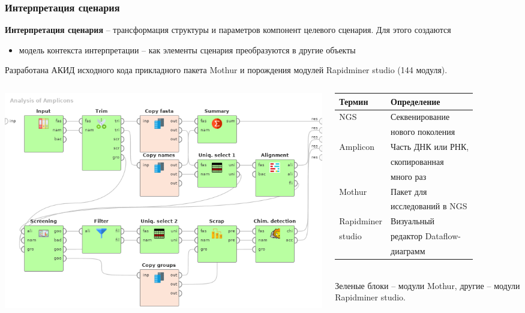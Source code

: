 \documentclass[10pt]{beamer}
\begin{document}
\begin{frame}
  \frametitle{Интерпретация сценария}
  \textbf{Интерпретация сценария} -- трансформация структуры и параметров компонент целевого сценария.  Для этого создаются
  \begin{itemize}
  \item модель контекста интерпретации -- как элементы сценария преобразуются в другие объекты
  \end{itemize}

Разработана АКИД исходного кода прикладного пакета Mothur и порождения модулей Rapidminer studio (144 модуля).
  \begin{columns}
    \begin{column}{0.6\textwidth}
      \begin{raggedright}
        \includegraphics[width=1\linewidth]{Dataflow-color-en.png}
      \end{raggedright}
    \end{column}
    \begin{column}{0.4\textwidth}\footnotesize
      \begin{tabular}{ll}
        Термин & Определение \\
        \hline
        NGS & Секвенирование \\ & нового поколения\\
        Amplicon & Часть ДНК или РНК, \\
               & скопированная  \\
               & много раз \\
        Mothur & Пакет для\\ & исследований в NGS \\
        Rapidminer & Визуальный \\
        studio     & редактор Dataflow-\\
             & диаграмм
      \end{tabular}
      ${}$\\[1em]
      Зеленые блоки -- модули Mothur, другие -- модули Rapidminer studio.
    \end{column}
  \end{columns}
  \vspace{1em}
\end{frame}
\end{document}
